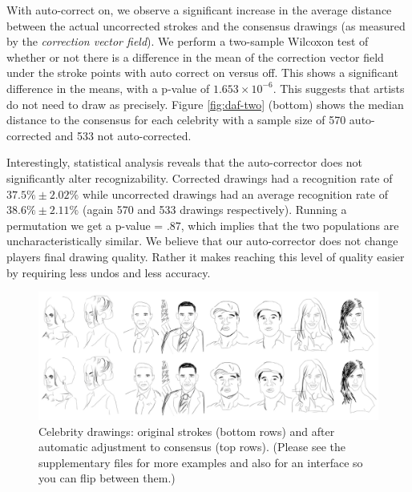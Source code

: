  
With auto-correct on,  we observe a significant increase in the average distance between the actual uncorrected strokes
and the consensus drawings (as measured by the \emph{correction vector field}). We perform a two-sample Wilcoxon test of
whether or not there is a difference in the mean of the correction vector field under the stroke points with auto correct
on versus off. This shows a significant difference in the means, with a p-value of $1.653 \times 10^{-6}$.  This suggests that
artists do not need to draw as precisely. Figure \ref{fig:daf-two} (bottom) shows the median distance to the consensus for
each celebrity with a sample size of 570 auto-corrected and 533 not auto-corrected.
 

Interestingly, statistical analysis reveals that the auto-corrector does not significantly alter recognizability.
Corrected drawings had a recognition rate of $37.5\% \pm 2.02\%$ while uncorrected drawings had an average recognition
rate of $38.6\% \pm 2.11\%$ (again 570 and 533 drawings respectively). Running a permutation we get a p-value = .87, which implies that the two populations are uncharacteristically similar. We believe that our auto-corrector does not change
players final drawing quality. Rather it makes reaching this level of quality easier by requiring less undos and less
accuracy.

\begin{figure}[!t]
  \centering%
\includegraphics[width=7in]{./figures/ResultsAll_16.pdf}
\vspace{-0.35in}
  \caption{Celebrity drawings: original strokes (bottom rows) and after automatic adjustment to consensus (top rows). (Please see the supplementary files for more examples and also for an interface so you can flip between them.)}
\vspace{-0.25in}
  \label{fig:results}
\end{figure}
